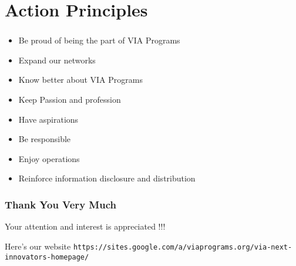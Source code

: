 \documentclass[dvipdfmx,10pt]{beamer}
\newcommand{\bb}{\begin{block}}
\newcommand{\eb}{\end{block}}
\newcommand{\ft}{\frametitle}
\begin{document}
\section{Action Principles}
\begin{frame}\ft{\insertsection}
\begin{itemize}
\item Be proud of being the part of VIA Programs
\item Expand our networks
\item Know better about VIA Programs
\item Keep Passion and profession
\item Have aspirations
\item Be responsible
\item Enjoy operations
\item Reinforce information disclosure and distribution
\end{itemize}
\end{frame}

\begin{frame}\ft{Thank You Very Much}
Your attention and interest is appreciated !!!
\bb{Here's our website}
\footnotesize
\texttt{https://sites.google.com/a/viaprograms.org/via-next-innovators-homepage/}
\normalsize
\eb
\end{frame}
\end{document}
